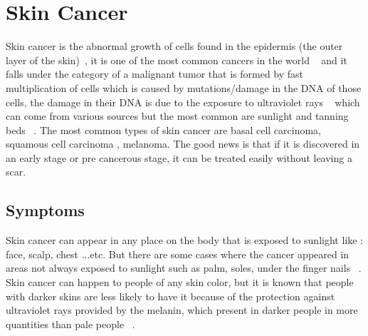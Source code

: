 \section{Skin Cancer}

        Skin cancer is the abnormal growth of cells found in the epidermis (the outer layer of the skin)~\cite{scf2022}, it is one of the most common cancers in the world ~\cite{nhs2020} and it falls under the category of a malignant tumor that is formed by fast multiplication of cells which is caused by mutations/damage in the DNA  of those cells, the damage in their DNA is due to the exposure to ultraviolet rays ~\cite{scf2022} which can come from various sources but the most common are sunlight and tanning beds  ~\cite{mayo2020, scf2022, nhs2020}. The most common types of skin cancer are  basal cell carcinoma, squamous cell carcinoma , melanoma. The good news is that if it is discovered in an early stage or pre cancerous stage, it can be treated easily without leaving a scar.



\subsection{Symptoms} 
        Skin cancer can appear in any place on the body that is exposed to sunlight like : face, scalp, chest ...etc. But there are some cases where the cancer appeared in areas not always exposed to sunlight such as  palm, soles, under the finger nails ~\cite{mayo2020}.
        Skin cancer can happen to people of any skin color, but it is known that people with darker skins are less likely to have it because of the protection against ultraviolet rays provided by the melanin, which present in darker people in more quantities than pale people ~\cite{mayo2020}.

